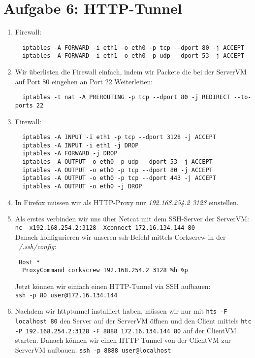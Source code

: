 \documentclass{scrartcl}
\begin{document}
      \section*{Aufgabe 6: HTTP-Tunnel}
      \label{sec:Aufgabe 6: HTTP-Tunnel}
        \begin{enumerate}
          \item Firewall:
          \begin{lstlisting}
  iptables -A FORWARD -i eth1 -o eth0 -p tcp --dport 80 -j ACCEPT
  iptables -A FORWARD -i eth1 -o eth0 -p udp --dport 53 -j ACCEPT
          \end{lstlisting}
        \item Wir überlisten die Firewall einfach, indem wir Packete die bei der
        ServerVM auf Port 80 eingehen an Port 22 Weiterleiten:
        \begin{lstlisting}
  iptables -t nat -A PREROUTING -p tcp --dport 80 -j REDIRECT --to-ports 22
        \end{lstlisting}
        \item Firewall:
        \begin{lstlisting}
  iptables -A INPUT -i eth1 -p tcp --dport 3128 -j ACCEPT
  iptables -A INPUT -i eth1 -j DROP
  iptables -A FORWARD -j DROP
  iptables -A OUTPUT -o eth0 -p udp --dport 53 -j ACCEPT
  iptables -A OUTPUT -o eth0 -p tcp --dport 80 -j ACCEPT
  iptables -A OUTPUT -o eth0 -p tcp --dport 443 -j ACCEPT
  iptables -A OUTPUT -o eth0 -j DROP
        \end{lstlisting}
        \item In Firefox müssen wir als HTTP-Proxy nur \textit{192.168.254.2
        3128} einstellen.
        \item
        Als erstes verbinden wir uns über Netcat mit dem SSH-Server der ServerVM:\\
        \texttt{nc -x192.168.254.2:3128 -Xconnect 172.16.134.144 80}\\
        Danach konfigurieren wir unseren ssh-Befehl mittels Corkscrew in der
        \textit{~/.ssh/config}:\\
        \begin{lstlisting}
 Host *
  ProxyCommand corkscrew 192.168.254.2 3128 %h %p
        \end{lstlisting}
        Jetzt können wir einfach einen HTTP-Tunnel via SSH aufbauen:\\
        \texttt{ssh -p 80 user@172.16.134.144}
        \item Nachdem wir httptunnel installiert haben, müssen wir nur mit
        \texttt{hts -F localhost 80} den Server auf der ServerVM öffnen und
        den Client mittels \texttt{htc -P 192.168.254.2:3128 -F 8888
        172.16.134.144 80} auf der ClientVM starten. Danach können wir einen
        HTTP-Tunnel von der ClientVM zur ServerVM aufbauen:
        \texttt{ssh -p 8888 user@localhost}
        \end{enumerate}
\end{document}
